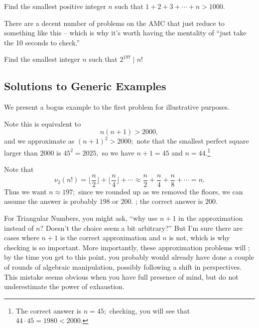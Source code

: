 \documentclass[mast]{lucky}
\begin{document}
\begin{exam}
Find the smallest positive integer $n$ such that $1+2+3+\cdots+n>1000.$
\end{exam}

There are a decent number of problems on the AMC that just reduce to something like this -- which is why it's worth having the mentality of ``just take the 10 seconds to check.''

\begin{exam}
Find the smallest integer $n$ such that $2^{197}\mid n!$
\end{exam}

\pagebreak

\subsection{Solutions to Generic Examples}

We present a bogus example to the first problem for illustrative purposes.

\begin{sol}
Note this is equivalent to
\[n(n+1)>2000,\]
and we approximate as $(n+1)^2>2000;$ note that the smallest perfect square larger than $2000$ is $45^2=2025,$ so we have $n+1=45$ and $n=44.$\footnote{The correct answer is $n=45;$ checking, you will see that $44\cdot 45=1980<2000.$}
\end{sol}

\begin{sol}
Note that
\[\nu_2(n!)=\lfloor\frac{n}{2}\rfloor+\lfloor\frac{n}{4}\rfloor+\cdots\approx \frac{n}{2}+\frac{n}{4}+\frac{n}{8}+\cdots=n.\]
Thus we want $n\approx 197;$ since we rounded up as we removed the floors, we can assume the answer is probably $198$ or $200.$ ; the correct answer is $200.$
\end{sol}

For Triangular Numbers, you might ask, ``why use $n+1$ in the approximation instead of $n?$ Doesn't the choice seem a bit arbitrary?'' But I'm sure there are cases where $n+1$ is the correct approximation and $n$ is not, which is why checking is so important. More importantly, these approximation problems will ; by the time you get to this point, you probably would already have done a couple of rounds of algebraic manipulation, possibly following a shift in perspectives. This mistake seems obvious when you have full presence of mind, but do not underestimate the power of exhaustion.
\end{document}
